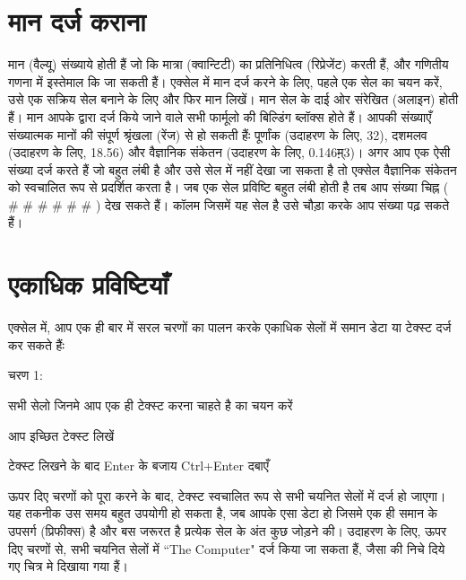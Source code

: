 \section{मान दर्ज कराना}\label{id-1.31}

मान (वैल्यू) संख्याये होती हैं जो कि मात्रा (क्वान्टिटी) का प्रतिनिधित्व (रिप्रेजेंट) करती हैं, और गणितीय गणना में इस्तेमाल कि जा सकती हैं। एक्सेल में मान दर्ज करने के लिए, पहले एक सेल का चयन करें, उसे एक सक्रिय सेल बनाने के लिए और फिर मान लिखें। मान सेल के दाई ओर संरेखित (अलाइन) होती हैं। मान आपके द्वारा दर्ज किये जाने वाले सभी फार्मूलो की बिल्डिंग ब्लॉक्स होते हैं। आपकी संख्याएँ संख्यात्मक मानों की संपूर्ण श्रृंखला (रेंज) से हो सकती हैंः पूर्णांक (उदाहरण के लिए, 32), दशमलव (उदाहरण के लिए, 18.56) और वैज्ञानिक संकेतन (उदाहरण के लिए, 0.146म़्3)। अगर आप एक ऐसी संख्या दर्ज करते हैं जो बहुत लंबी है और उसे सेल में नहीं देखा जा सकता है तो एक्सेल वैज्ञानिक संकेतन को स्वचालित रूप से प्रदर्शित करता है। जब एक सेल प्रविष्टि बहुत लंबी होती है तब आप संख्या चिह्न ( {\eng \# \# \# \# \# \#} ) देख सकते हैं। कॉलम जिसमें यह सेल है उसे चौड़ा करके आप संख्या पढ़ सकते हैं।

	
\section{एकाधिक प्रविष्टियाँ}\label{id-1.32}

एक्सेल में, आप एक ही बार में सरल चरणों का पालन करके एकाधिक सेलों में समान डेटा या टेक्स्ट दर्ज कर सकते हैंः

\begin{descriptionSimple}{चरण 1:}
\item[चरण 1]  सभी सेलो जिनमे आप एक ही टेक्स्ट करना चाहते है का चयन करें
\item[चरण 2]  आप इच्छित टेक्स्ट लिखें
\item[चरण 3]  टेक्स्ट लिखने के बाद  {\eng Enter}  के बजाय  {\eng Ctrl+Enter}  दबाएँ
\end{descriptionSimple}

ऊपर दिए चरणों को पूरा करने के बाद, टेक्स्ट स्वचालित रूप से सभी चयनित सेलों में दर्ज हो जाएगा। यह तकनीक उस समय बहुत उपयोगी हो सकता है, जब आपके एसा डेटा हो जिसमे एक ही समान के उपसर्ग (प्रिफीक्स) है और बस जरूरत है प्रत्येक सेल के अंत कुछ जोड़ने की। उदाहरण के लिए, ऊपर दिए चरणों से, सभी चयनित सेलों में  {\eng ``The Computer"}  दर्ज किया जा सकता हैं, जैसा की निचे दिये गए चित्र मे दिखाया गया हैं।

